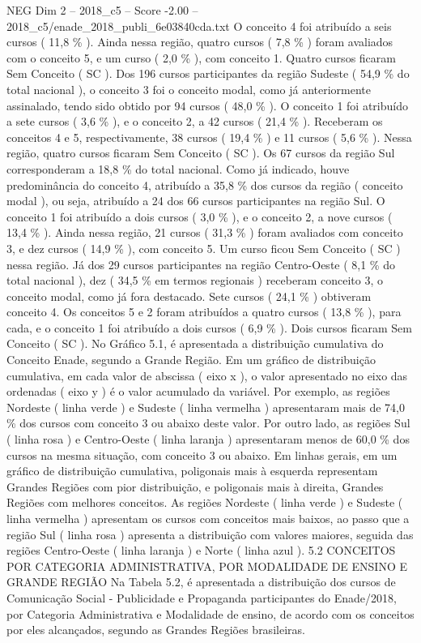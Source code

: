 \begin{textsample}{NEG Dim 2 – 2018\_c5 – Score -2.00 – 2018\_c5/enade\_2018\_publi\_6e03840cda.txt}
O conceito 4 foi atribuído a seis cursos ( 11,8 \% ).
Ainda nessa região, quatro cursos ( 7,8 \% ) foram avaliados com o conceito 5, e um curso ( 2,0 \% ), com conceito 1.
Quatro cursos ficaram Sem Conceito ( SC ).
Dos 196 cursos participantes da região Sudeste ( 54,9 \% do total nacional ), o conceito 3 foi o conceito modal, como já anteriormente assinalado, tendo sido obtido por 94 cursos ( 48,0 \% ).
O conceito 1 foi atribuído a sete cursos ( 3,6 \% ), e o conceito 2, a 42 cursos ( 21,4 \% ).
Receberam os conceitos 4 e 5, respectivamente, 38 cursos ( 19,4 \% ) e 11 cursos ( 5,6 \% ).
Nessa região, quatro cursos ficaram Sem Conceito ( SC ).
Os 67 cursos da região Sul corresponderam a 18,8 \% do total nacional.
Como já indicado, houve predominância do conceito 4, atribuído a 35,8 \% dos cursos da região ( conceito modal ), ou seja, atribuído a 24 dos 66 cursos participantes na região Sul.
O conceito 1 foi atribuído a dois cursos ( 3,0 \% ), e o conceito 2, a nove cursos ( 13,4 \% ).
Ainda nessa região, 21 cursos ( 31,3 \% ) foram avaliados com conceito 3, e dez cursos ( 14,9 \% ), com conceito 5.
Um curso ficou Sem Conceito ( SC ) nessa região.
Já dos 29 cursos participantes na região Centro-Oeste ( 8,1 \% do total nacional ), dez ( 34,5 \% em termos regionais ) receberam conceito 3, o conceito modal, como já fora destacado.
Sete cursos ( 24,1 \% ) obtiveram conceito 4.
Os conceitos 5 e 2 foram atribuídos a quatro cursos ( 13,8 \% ), para cada, e o conceito 1 foi atribuído a dois cursos ( 6,9 \% ).
Dois cursos ficaram Sem Conceito ( SC ).
No Gráfico 5.1, é apresentada a distribuição cumulativa do Conceito Enade, segundo a Grande Região.
Em um gráfico de distribuição cumulativa, em cada valor de abscissa ( eixo x ), o valor apresentado no eixo das ordenadas ( eixo y ) é o valor acumulado da variável.
Por exemplo, as regiões Nordeste ( linha verde ) e Sudeste ( linha vermelha ) apresentaram mais de 74,0 \% dos cursos com conceito 3 ou abaixo deste valor.
Por outro lado, as regiões Sul ( linha rosa ) e Centro-Oeste ( linha laranja ) apresentaram menos de 60,0 \% dos cursos na mesma situação, com conceito 3 ou abaixo.
Em linhas gerais, em um gráfico de distribuição cumulativa, poligonais mais à esquerda representam Grandes Regiões com pior distribuição, e poligonais mais à direita, Grandes Regiões com melhores conceitos.
As regiões Nordeste ( linha verde ) e Sudeste ( linha vermelha ) apresentam os cursos com conceitos mais baixos, ao passo que a região Sul ( linha rosa ) apresenta a distribuição com valores maiores, seguida das regiões Centro-Oeste ( linha laranja ) e Norte ( linha azul ). 5.2 CONCEITOS POR CATEGORIA ADMINISTRATIVA, POR MODALIDADE DE ENSINO E GRANDE REGIÃO Na Tabela 5.2, é apresentada a distribuição dos cursos de Comunicação Social - Publicidade e Propaganda participantes do Enade/2018, por Categoria Administrativa e Modalidade de ensino, de acordo com os conceitos por eles alcançados, segundo as Grandes Regiões brasileiras.

\end{textsample}
